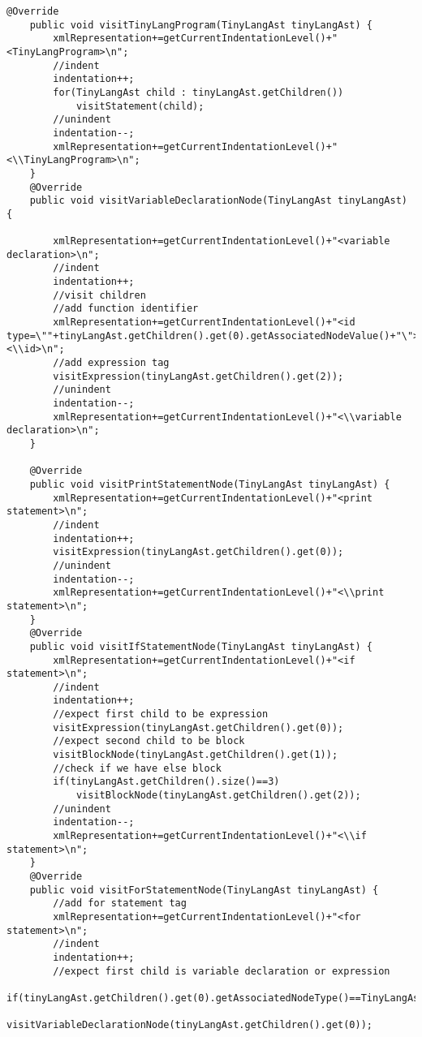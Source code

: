 \begin{lstlisting}[basicstyle=\miniscule,caption=Generating an XML representation of AST,label=listing:xmlGeneration]
	@Override
	public void visitTinyLangProgram(TinyLangAst tinyLangAst) {
		xmlRepresentation+=getCurrentIndentationLevel()+"<TinyLangProgram>\n";
		//indent
		indentation++;
		for(TinyLangAst child : tinyLangAst.getChildren())
			visitStatement(child);
		//unindent
		indentation--;
		xmlRepresentation+=getCurrentIndentationLevel()+"<\\TinyLangProgram>\n";		
	}
	@Override
	public void visitVariableDeclarationNode(TinyLangAst tinyLangAst) {
	
		xmlRepresentation+=getCurrentIndentationLevel()+"<variable declaration>\n";
		//indent
		indentation++;
		//visit children
		//add function identifier
		xmlRepresentation+=getCurrentIndentationLevel()+"<id type=\""+tinyLangAst.getChildren().get(0).getAssociatedNodeValue()+"\">"+tinyLangAst.getChildren().get(1).getAssociatedNodeValue()+"<\\id>\n";
		//add expression tag
		visitExpression(tinyLangAst.getChildren().get(2));
		//unindent
		indentation--;
		xmlRepresentation+=getCurrentIndentationLevel()+"<\\variable declaration>\n";	
	}

	@Override
	public void visitPrintStatementNode(TinyLangAst tinyLangAst) {
		xmlRepresentation+=getCurrentIndentationLevel()+"<print statement>\n";
		//indent
		indentation++;
		visitExpression(tinyLangAst.getChildren().get(0));
		//unindent
		indentation--;
		xmlRepresentation+=getCurrentIndentationLevel()+"<\\print statement>\n";			
	}
	@Override
	public void visitIfStatementNode(TinyLangAst tinyLangAst) {
		xmlRepresentation+=getCurrentIndentationLevel()+"<if statement>\n";
		//indent
		indentation++;
		//expect first child to be expression
		visitExpression(tinyLangAst.getChildren().get(0));
		//expect second child to be block 
		visitBlockNode(tinyLangAst.getChildren().get(1));
		//check if we have else block
		if(tinyLangAst.getChildren().size()==3)
			visitBlockNode(tinyLangAst.getChildren().get(2));	
		//unindent
		indentation--;
		xmlRepresentation+=getCurrentIndentationLevel()+"<\\if statement>\n";			
	}
	@Override
	public void visitForStatementNode(TinyLangAst tinyLangAst) {
		//add for statement tag
		xmlRepresentation+=getCurrentIndentationLevel()+"<for statement>\n";
		//indent
		indentation++;
		//expect first child is variable declaration or expression
		if(tinyLangAst.getChildren().get(0).getAssociatedNodeType()==TinyLangAstNodes.AST_VARIABLE_DECLARATION_NODE)
			visitVariableDeclarationNode(tinyLangAst.getChildren().get(0));	
	

\end{lstlisting}
